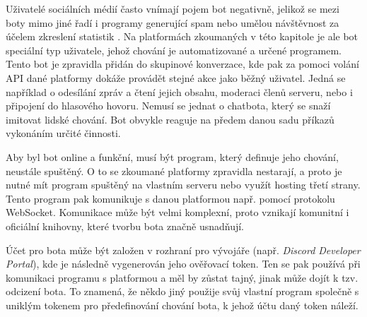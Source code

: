 \documentclass[FM]{tulthesis}
\begin{document}
	Uživatelé sociálních médií často vnímají pojem bot negativně, jelikož se mezi boty mimo jiné řadí i programy generující spam nebo umělou návštěvnost za účelem zkreslení statistik \cite{lit_Discord}. Na platformách zkoumaných v této kapitole je ale bot speciální typ uživatele, jehož chování je automatizované a určené programem. Tento bot je zpravidla přidán do skupinové konverzace, kde pak za pomoci volání API dané platformy dokáže provádět stejné akce jako běžný uživatel. Jedná se například o odesílání zpráv a čtení jejich obsahu, moderaci členů serveru, nebo i připojení do hlasového hovoru. Nemusí se jednat o chatbota, který se snaží imitovat lidské chování. Bot obvykle reaguje na předem danou sadu příkazů vykonáním určité činnosti.
		
	Aby byl bot online a funkční, musí být program, který definuje jeho chování, neustále spuštěný. O to se zkoumané platformy zpravidla nestarají, a proto je nutné mít program spuštěný na vlastním serveru nebo využít hosting třetí strany. Tento program pak komunikuje s danou platformou např. pomocí protokolu \mbox{WebSocket}. Komunikace může být velmi komplexní, proto vznikají komunitní i oficiální knihovny, které tvorbu bota značně usnadňují.
	
	Účet pro bota může být založen v rozhraní pro vývojáře (např. \textit{Discord Developer Portal}), kde je následně vygenerován jeho ověřovací token. Ten se pak používá při komunikaci programu s platformou a měl by zůstat tajný, jinak může dojít k tzv. odcizení bota. To znamená, že někdo jiný použije svůj vlastní program společně s uniklým tokenem pro předefinování chování bota, k jehož účtu daný token náleží.
	
\end{document}
